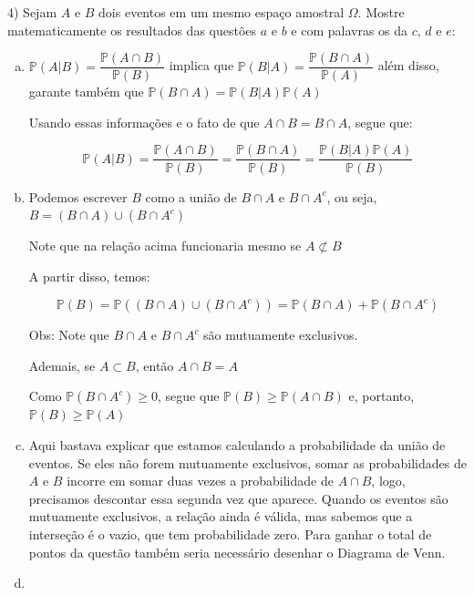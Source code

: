 \documentclass[12pt]{article}
\begin{document}
4) Sejam $A$ e $B$ dois eventos em um mesmo espaço amostral $\Omega$. Mostre matematicamente os resultados das questões $a$ e $b$ e com palavras os da $c$, $d$ e $e$:
\begin{enumerate}[a)]
    \item 
    $\mathds{P}(A|B) = \dfrac{\mathds{P}(A \cap B)}{\mathds{P}(B)}$ implica que $\mathds{P}(B|A) = \dfrac{\mathds{P}(B \cap A)}{\mathds{P}(A)}$
    além disso, garante também que  $\mathds{P}(B \cap A) = \mathds{P}(B|A) \mathds{P}(A)$

    Usando essas informações e o fato de que $A \cap B = B \cap A$, segue que:

    $$\mathds{P}(A|B) = \dfrac{\mathds{P}(A \cap B)}{\mathds{P}(B)} = \dfrac{\mathds{P}(B \cap A)}{\mathds{P}(B)} = 
    \dfrac{\mathds{P}(B|A) \mathds{P}(A)}{\mathds{P}(B)}
    $$
    
    \item 
    
    Podemos escrever $B$ como a união de $B \cap A$ e $B\cap A^c$, ou seja, $B = (B \cap A) \cup (B \cap A^c)$

Note que na relação acima funcionaria mesmo se $A \not\subset B$

A partir disso, temos:

$$\mathds{P}(B) = \mathds{P}((B \cap A) \cup (B \cap A^c)) =  \mathds{P}(B \cap A) +  \mathds{P}(B \cap A^c)$$

Obs: Note que $B \cap A$ e $B \cap A^c$ são mutuamente exclusivos.

Ademais, se $A \subset B$, então $A \cap B = A$

Como $\mathds{P}\left(B \cap A^c\right) \geq 0$, segue que $\mathds{P}(B) \geq  \mathds{P}(A \cap B)$ e, portanto, $\mathds{P}(B) \geq  \mathds{P}(A)$

    \item 

    Aqui bastava explicar que estamos calculando a probabilidade da união de eventos. Se eles não forem mutuamente exclusivos, 
    somar as probabilidades de $A$ e $B$ incorre em somar duas vezes a probabilidade de $A \cap B$, logo, precisamos descontar essa segunda vez que aparece. 
    Quando os eventos são mutuamente exclusivos, a relação ainda é válida, mas sabemos que a interseção é o vazio, que tem probabilidade zero. 
    Para ganhar o total de pontos da questão também seria necessário desenhar o Diagrama de Venn.

    \item 
    

\end{enumerate}
\end{document}
